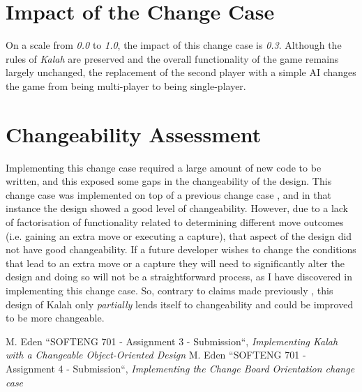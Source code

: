 \documentclass[10pt, a4paper, conference]{IEEEtran}
\begin{document}
\section{Impact of the Change Case}
On a scale from \textit{0.0} to \textit{1.0}, the impact of this change case is
\textit{0.3}. Although the rules of \textit{Kalah} are preserved and the
overall functionality of the game remains largely unchanged, the replacement 
of the second player with a simple AI changes the game from being multi-player 
to being single-player.

\section{Changeability Assessment}
Implementing this change case required a large amount of new code to be
written, and this exposed some gaps in the changeability of the design. This
change case was implemented on top of a previous change case
\cite{a4-change-case}, and in that instance the design showed a good level of 
changeability. However, due to a lack of factorisation of functionality related
to determining different move outcomes (i.e. gaining an extra move or executing
a capture), that aspect of the design did not have good changeability. If
a future developer wishes to change the conditions that lead to an extra move
or a capture they will need to significantly alter the design and doing so will
not be a straightforward process, as I have discovered in implementing this
change case. So, contrary to claims made previously \cite{a3-design}, this
design of Kalah only \textit{partially} lends itself to changeability and could
be improved to be more changeable.

\begin{thebibliography}{00}
   M. Eden ``SOFTENG 701 - Assignment 3 - Submission``,
    \textit{Implementing Kalah with a Changeable Object-Oriented Design}
   M. Eden ``SOFTENG 701 - Assignment 4 - Submission``,
    \textit{Implementing the Change Board Orientation change case}
\end{thebibliography}
\end{document}
